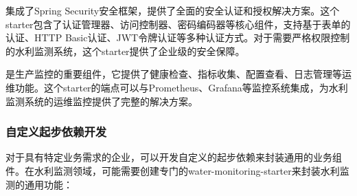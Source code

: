 集成了Spring Security安全框架，提供了全面的安全认证和授权解决方案。这个starter包含了认证管理器、访问控制器、密码编码器等核心组件，支持基于表单的认证、HTTP Basic认证、JWT令牌认证等多种认证方式。对于需要严格权限控制的水利监测系统，这个starter提供了企业级的安全保障。

是生产监控的重要组件，它提供了健康检查、指标收集、配置查看、日志管理等运维功能。这个starter的端点可以与Prometheus、Grafana等监控系统集成，为水利监测系统的运维监控提供了完整的解决方案。

\hypertarget{ux81eaux5b9aux4e49ux8d77ux6b65ux4f9dux8d56ux5f00ux53d1}{%
\subsubsection{自定义起步依赖开发}\label{ux81eaux5b9aux4e49ux8d77ux6b65ux4f9dux8d56ux5f00ux53d1}}

对于具有特定业务需求的企业，可以开发自定义的起步依赖来封装通用的业务组件。在水利监测领域，可能需要创建专门的water-monitoring-starter来封装水利监测的通用功能：

